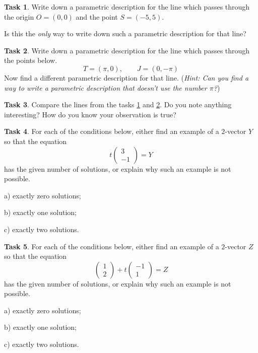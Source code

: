 \documentclass{tufte-book}
\theoremstyle{definition}
\newtheorem{task}{Task}
\begin{document}
\begin{task}\label{task:line-through-origin}
Write down a parametric description for the line which passes through the origin $O=(0,0)$ and the 
point $S = (-5,5)$.

Is this the \emph{only} way to write down such a parametric description for that line?
\end{task}


\begin{task}\label{task:line-through-points}
Write down a parametric description for the line which passes through the points below.
\[
 T = (\pi, 0), \qquad J = (0,-\pi)
\]
Now find a different parametric description for that line. (\emph{Hint: Can you find a way to write a parametric description that doesn't use the number $\pi$?})
\end{task}

\begin{task}
Compare the lines from the tasks \ref{task:line-through-origin} and \ref{task:line-through-points}. Do you note anything interesting? How do you know your observation is true?
\end{task}


\begin{task}
For each of the conditions below, either find an example of a $2$-vector $Y$ so that the equation
\[
t\begin{pmatrix}3\\-1\end{pmatrix} = Y
\]
has the given number of solutions, or explain why such an example is not possible.
\begin{compactitem}
\item[a)] exactly zero solutions;
\item[b)] exactly one solution; 
\item[c)] exactly two solutions.
\end{compactitem}
\end{task}



\begin{task}
For each of the conditions below, either find an example of a $2$-vector $Z$ so that the equation
\[
\begin{pmatrix}1\\2\end{pmatrix} + t\begin{pmatrix}-1\\1 \end{pmatrix} = Z
\]
has the given number of solutions, or explain why such an example is not possible.
\begin{compactitem}
\item[a)] exactly zero solutions;
\item[b)] exactly one solution; 
\item[c)] exactly two solutions.
\end{compactitem}
\end{task}
\end{document}

